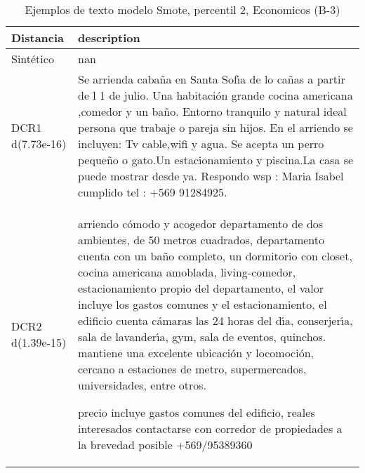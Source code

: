 \begin{table}[H]
\centering
\fontsize{10}{14}\selectfont
\caption{Ejemplos de texto modelo Smote, percentil 2, Economicos (B-3)}
\label{table-example-economicos-b-3-smote-enc-2p-text}
\begin{tabular}{|l|m{35em}|}
\hline
\rowcolor[gray]{0.8}
Distancia & description \\
\hline Sintético & nan \\
\hline DCR1 d(7.73e-16) & Se arrienda caba\~na en Santa Sof{\'\i}a de lo ca\~nas a partir de l 1 de julio. Una habitaci\'on grande cocina americana ,comedor y un ba\~no. Entorno tranquilo y natural ideal persona que trabaje o pareja sin hijos. En el arriendo se incluyen: Tv cable,wifi y agua. Se acepta un perro peque\~no o gato.Un estacionamiento y piscina.La casa se puede mostrar desde ya. Respondo wsp : Maria Isabel cumplido tel : +569 91284925. \\
\hline DCR2 d(1.39e-15) & arriendo c\'omodo y acogedor departamento de dos ambientes, de 50 metros cuadrados, departamento cuenta con un ba\~no completo, un dormitorio con closet, cocina americana amoblada, living-comedor, estacionamiento propio del departamento, el valor incluye los gastos comunes y el estacionamiento, el edificio cuenta c\'amaras las 24 horas del d{\'\i}a, conserjer{\'\i}a, sala de lavander{\'\i}a, gym, sala de eventos, quinchos. mantiene una excelente ubicaci\'on y locomoci\'on, cercano a estaciones de metro, supermercados, universidades, entre otros.

precio incluye gastos comunes del edificio, reales interesados contactarse con corredor de propiedades a la brevedad posible +569/95389360 \\
\hline
\end{tabular}
\end{table}
